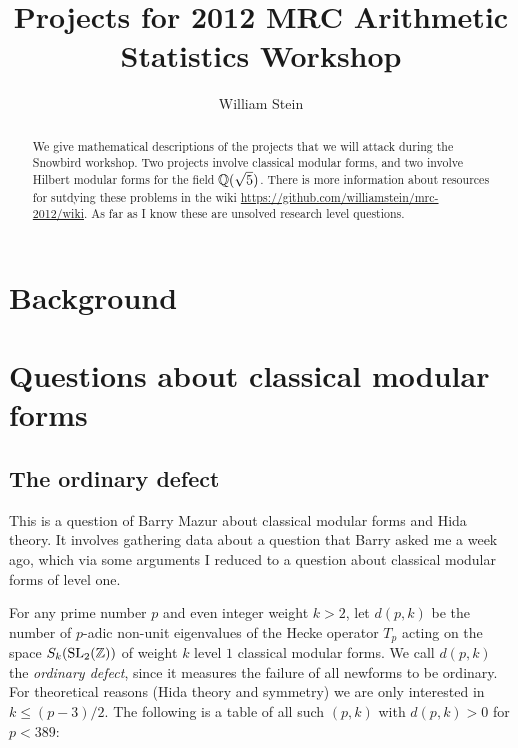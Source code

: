 \documentclass{article}
\title{Projects for 2012 MRC Arithmetic Statistics Workshop}
\author{William Stein}
\begin{document}
\maketitle
\begin{abstract}
  We give mathematical descriptions of the projects that we will
  attack during the Snowbird workshop.  Two projects involve classical
  modular forms, and two involve Hilbert modular forms for the field
  $\mathbb{Q}(\sqrt{5})$. There is more information about resources for
  sutdying these problems in the wiki
  \url{https://github.com/williamstein/mrc-2012/wiki}.
As far as I know these are unsolved research level questions. 
\end{abstract}

\tableofcontents

\section{Background}


\section{Questions about classical modular forms}

\subsection{The ordinary defect}

This is a question of Barry Mazur about classical modular forms and
Hida theory.  It involves gathering data about a question that Barry
asked me a week ago, which via some arguments I reduced to a question
about classical modular forms of level one.

For any prime number $p$ and even integer weight $k>2$, let $d(p,k)$
be the number of $p$-adic non-unit eigenvalues of the Hecke operator
$T_p$ acting on the space $S_k(\operatorname{SL}_2(\mathbb{Z}))$ of weight $k$ level $1$
classical modular forms. We call $d(p,k)$ the {\em ordinary defect},
since it measures the failure of all newforms to be ordinary.  For
theoretical reasons (Hida theory and symmetry) we are only
interested in $k\leq (p-3)/2$.  The following is a table of all such
$(p,k)$ with $d(p,k)>0$ for $p<389$:
\end{document}
